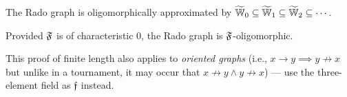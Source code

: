 \begin{theorem}
    The Rado graph is oligomorphically approximated by $\widetilde {\mathbb{W}}_0 \subseteq \widetilde {\mathbb{W}}_1 \subseteq \widetilde {\mathbb{W}}_2 \subseteq \cdots$.
\end{theorem}

\begin{corollary}
    Provided $\mathfrak{F}$ is of characteristic $0$, the Rado graph is $\mathfrak{F}$-oligomorphic.
\end{corollary}

This proof of finite length also applies to \emph{oriented graphs} (i.e., $x \to y \implies y \not\to x$ but unlike in a tournament, it may occur that $x \not\to y \wedge y \not\to x$)
--- use the three-element field as $\mathfrak{f}$ instead.
